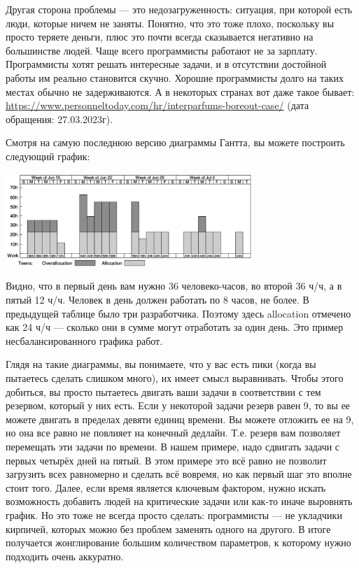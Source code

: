 \documentclass{../../text-style}
\begin{document}
Другая сторона проблемы --- это недозагруженность: ситуация, при которой есть люди, которые ничем не заняты. Понятно, что это тоже плохо, поскольку вы просто теряете деньги, плюс это почти всегда сказывается негативно на большинстве людей. Чаще всего программисты работают не за зарплату. Программисты хотят решать интересные задачи, и в отсутствии достойной работы им реально становится скучно. Хорошие программисты долго на таких местах обычно не задерживаются. А в некоторых странах вот даже такое бывает: \url{https://www.personneltoday.com/hr/interparfums-boreout-case/} (дата обращения: 27.03.2023г).

Смотря на самую последнюю версию диаграммы Гантта, вы можете построить следующий график:

\begin{center}
    \includegraphics[width=0.7\textwidth]{resourceAllocation.png}
\end{center}

Видно, что в первый день вам нужно 36 человеко-часов, во второй 36 ч/ч, а в пятый 12 ч/ч. Человек в день должен работать по 8 часов, не более. В предыдущей таблице было три разработчика. Поэтому здесь allocation отмечено как 24 ч/ч --- сколько они в сумме могут отработать за один день. Это пример несбалансированного графика работ.

Глядя на такие диаграммы, вы понимаете, что у вас есть пики (когда вы пытаетесь сделать слишком много), их имеет смысл выравнивать. Чтобы этого добиться, вы просто пытаетесь двигать ваши задачи в соответствии с тем резервом, который у них есть. Если у некоторой задачи резерв равен 9, то вы ее можете двигать в пределах девяти единиц времени. Вы можете отложить ее на 9, но она все равно не повлияет на конечный дедлайн. Т.е. резерв вам позволяет перемещать эти задачи по времени. В нашем примере, надо сдвигать задачи с первых четырёх дней на пятый. В этом примере это всё равно не позволит загрузить всех равномерно и сделать всё вовремя, но как первый шаг это вполне стоит того. Далее, если время является ключевым фактором, нужно искать возможность добавить людей на критические задачи или как-то иначе выровнять график. Но это тоже не всегда просто сделать: программисты --- не укладчики кирпичей, которых можно без проблем заменять одного на другого. В итоге получается жонглирование большим количеством параметров, к которому нужно подходить очень аккуратно.
\end{document}
